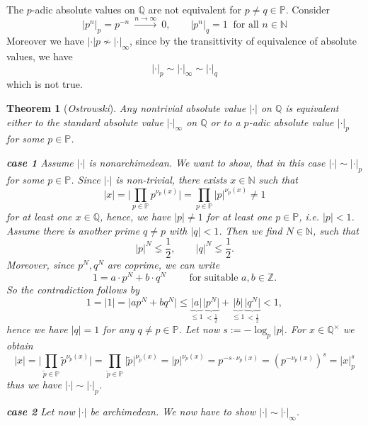 \documentclass[11pt]{book}
\newtheorem{theorem}{Theorem}[section]
\theoremstyle{nonumberbreak}
\newenvironment{pr}[1][]{\ifthenelse{\equal{#1}{}}{\proof}{\proof[#1]}\rm}{\endproof}
\newenvironment{ex}[1][]{\ifthenelse{\equal{#1}{}}{\example}{\example[#1]}\rm}{\endexample}
\begin{document}
\begin{spacing}{1.3}
\begin{ex} %
The $p$-adic absolute values on $\mathbb{Q}$ are not equivalent for $p \neq q \in \mathbb{P}$. Consider
$$|p^n|_p = p^{-n} \ \xrightarrow{n \to \infty}\ 0, \qquad |p^n|_q=1 \ \textrm{ for all } n \in \mathbb{N}$$
Moreover we have $|\cdot |p \nsim |\cdot |_{\infty}$, since by the transittivity of equivalence of absolute values, we have
$$|\cdot |_p \sim |\cdot |_{\infty} \sim |\cdot |_{q}$$
which is not true.
\end{ex}


\begin{theorem}[\rm \it Ostrowski]
Any nontrivial absolute value $| \cdot|$ on $\mathbb{Q}$ is equivalent either to the standard absolute value $|\cdot|_{\infty}$ on $\mathbb{Q}$ or to a $p$-adic absolute value $|\cdot|_p$ for some $p \in \mathbb{P}$.
\begin{pr}
\begin{compactenum}
\item[\textbf{case 1}] Assume $| \cdot |$ is nonarchimedean. We want to show, that in this case $|\cdot | \sim |\cdot |_p$ for some $p \in \mathbb{P}$.
Since $| \cdot|$ is non-trivial, there exists $x \in \mathbb{N}$ such that $$|x|=\bigg \vert \prod_{p \in \mathbb{P}} p^{\nu_p(x)}\bigg \vert=\prod_{p \in \mathbb{P}} |p|^{\nu_p(x)} \neq 1 $$ for at least one $x \in \mathbb{Q}$, hence, we have $|p| \neq 1$ for at least one $p \in \mathbb{P}$, i.e. $|p|<1$.
Assume there is another prime $q \neq p$ with $|q|<1$. Then we find $N \in \mathbb{N}$, such that
$$\vert p \vert ^N \lneq \frac{1}{2}, \qquad \vert q \vert ^N \lneq \frac{1}{2}.$$
Moreover, since $p^N, q^N$ are coprime, we  can write
$$1=a \cdot p^N+b \cdot q^N \qquad \textrm{ for suitable } a,b \in \mathbb{Z}.$$
So the contradiction follows by
$$1=|1|=\big\vert ap^N+bq^N \big\vert \leqslant \underbrace{\vert a\vert}_{\leqslant 1} \underbrace{\big\vert p^N\big\vert}_{<\frac{1}{2}} + \underbrace{\vert b \vert}_{\leqslant 1} \underbrace{\big\vert q^N \big\vert}_{< \frac{1}{2}} < 1,$$
hence we have $|q|=1$ for any $q\neq p \in \mathbb{P}$. Let now $s:= -\log_p|p|$. For $x \in \mathbb{Q}^{\times}$ we obtain
$$|x|=\bigg\vert \prod_{\tilde{p}\in \mathbb{P}}\tilde{p}^{\nu_{\tilde{p}}(x)} \bigg\vert = \prod_{\tilde{p} \in \mathbb{P}} \vert \tilde{p}\vert ^{\nu_{\tilde{p}}(x)}=|p|^{\nu_p(x)}=p^{-s \cdot \nu_p(x)}=\left(p^{-\nu_p(x)}\right)^s=|x|_p^s$$
thus we have $|\cdot| \sim |\cdot|_p$.
\item[\textbf{case 2}] Let now $|\cdot|$ be archimedean. We now have to show $|\cdot| \sim |\cdot|_{\infty}$.

\end{compactenum}
\end{pr}
\end{theorem}
\end{spacing}
\end{document}
